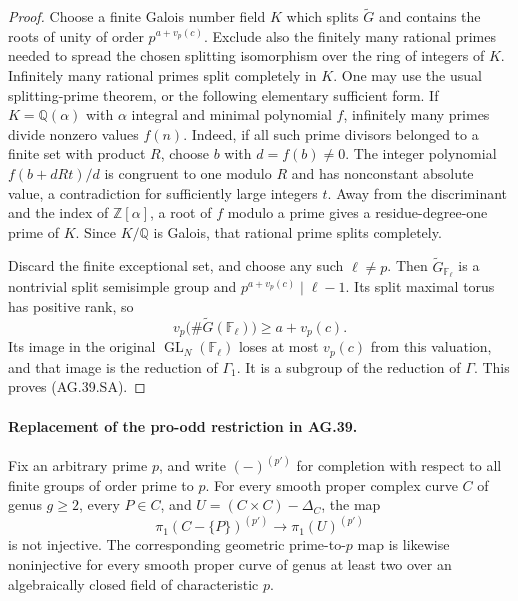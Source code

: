 \begin{proof}
Choose a finite Galois number field \(K\) which splits
\(\widetilde G\) and contains the roots of unity of order
\(p^{a+v_p(c)}\). Exclude also the finitely many rational
primes needed to spread the chosen splitting isomorphism
over the ring of integers of \(K\). Infinitely many rational primes split
completely in \(K\). One may use the usual splitting-prime
theorem, or the following elementary sufficient form. If
\(K=\mathbb Q(\alpha)\) with \(\alpha\) integral and minimal
polynomial \(f\), infinitely many primes divide nonzero values
\(f(n)\). Indeed, if all such prime divisors belonged to a
finite set with product \(R\), choose \(b\) with
\(d=f(b)\ne0\). The integer polynomial
\(f(b+dRt)/d\) is congruent to one modulo \(R\) and has
nonconstant absolute value, a contradiction for sufficiently
large integers \(t\). Away from the discriminant and the
index of \(\mathbb Z[\alpha]\), a root of \(f\) modulo a
prime gives a residue-degree-one prime of \(K\). Since
\(K/\mathbb Q\) is Galois, that rational prime splits completely.

Discard the finite exceptional set, and choose any such
\(\ell\ne p\). Then \(\widetilde G_{\mathbb F_\ell}\)
is a nontrivial split semisimple group and
\(p^{a+v_p(c)}\mid\ell-1\). Its split maximal torus has
positive rank, so
\[
       v_p\bigl(\#\widetilde G(\mathbb F_\ell)\bigr)
                          \geq a+v_p(c).
\]
Its image in the original \(\operatorname{GL}_N(\mathbb F_\ell)\)
loses at most \(v_p(c)\) from this valuation, and that image is
the reduction of \(\Gamma_1\). It is a subgroup of the
reduction of \(\Gamma\). This proves (AG.39.SA).
\end{proof}

\paragraph{Replacement of the pro-odd restriction in AG.39.}
Fix an arbitrary prime \(p\), and write \((-)^{(p')}\) for
completion with respect to all finite groups of order prime
to \(p\). For every smooth proper complex curve \(C\) of
genus \(g\geq2\), every \(P\in C\), and
\(U=(C\times C)-\Delta_C\), the map
\[
       \pi_1(C-\{P\})^{(p')}
                 \longrightarrow \pi_1(U)^{(p')}
                                                        \tag{AG.39.ALL}
\]
is not injective. The corresponding geometric prime-to-\(p\)
map is likewise noninjective for every smooth proper curve of
genus at least two over an algebraically closed field of
characteristic \(p\).

